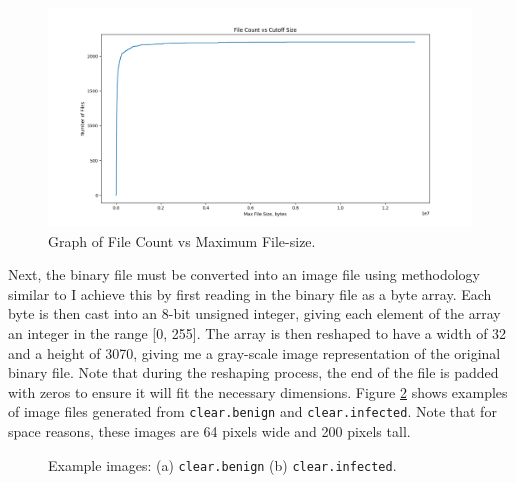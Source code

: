 \documentclass[12pt, letterpaper, titlepage]{article}
\newcommand{\figRef}[1]{Figure \ref{#1}}
\newcommand{\imageWidth}{32}
\newcommand{\imageHeight}{3070}
\begin{document}
\begin{figure}[H]
  \centering
  \includegraphics[width=\textwidth, keepaspectratio]{Images/file_size_vs_cutoff_size_all.png}
  \caption{Graph of File Count vs Maximum File-size.}
  \label{fig:FileSizeDist}
\end{figure}

Next, the binary file must be converted into an image file using methodology similar to \cite{Sgandurra}
I achieve this by first reading in the binary file as a byte array.
Each byte is then cast into an 8-bit unsigned integer, giving each element of the array an integer in the range [0, 255].
The array is then reshaped to have a width of \imageWidth{} and a height of \imageHeight{}, giving me a gray-scale image representation of the original binary file.
Note that during the reshaping process, the end of the file is padded with zeros to ensure it will fit the necessary dimensions.
\figRef{fig:FileImages} shows examples of image files generated from \verb|clear.benign| and \verb|clear.infected|.
Note that for space reasons, these images are 64 pixels wide and 200 pixels tall.

\begin{figure}[H]
  \centering
  \cprotect\caption{Example images: (a) \verb|clear.benign| (b) \verb|clear.infected|.}
  \label{fig:FileImages}
\end{figure}
\end{document}
